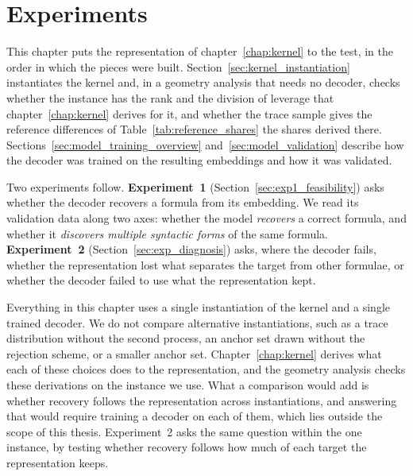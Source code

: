 \documentclass[titlepage,a4paper,11pt]{report}
\newenvironment{RSnewblock}{\par\color{blue!65!black}}{\par}
\begin{document}
\chapter{Experiments}\label{chap:experiments}
    \begin{RSnewblock}
    This chapter puts the representation of chapter~\ref{chap:kernel} to the test, in the order in which the pieces were built. Section~\ref{sec:kernel_instantiation} instantiates the kernel and, in a geometry analysis that needs no decoder, checks whether the instance has the rank and the division of leverage that chapter~\ref{chap:kernel} derives for it, and whether the trace sample gives the reference differences of Table~\ref{tab:reference_shares} the shares derived there. Sections~\ref{sec:model_training_overview} and~\ref{sec:model_validation} describe how the decoder was trained on the resulting embeddings and how it was validated.

    Two experiments follow. \textbf{Experiment~1} (Section~\ref{sec:exp1_feasibility}) asks whether the decoder recovers a formula from its embedding. We read its validation data along two axes: whether the model \emph{recovers} a correct formula, and whether it \emph{discovers multiple syntactic forms} of the same formula. \textbf{Experiment~2} (Section~\ref{sec:exp_diagnosis}) asks, where the decoder fails, whether the representation lost what separates the target from other formulae, or whether the decoder failed to use what the representation kept.

    Everything in this chapter uses a single instantiation of the kernel and a single trained decoder. We do not compare alternative instantiations, such as a trace distribution without the second process, an anchor set drawn without the rejection scheme, or a smaller anchor set. Chapter~\ref{chap:kernel} derives what each of these choices does to the representation, and the geometry analysis checks these derivations on the instance we use. What a comparison would add is whether recovery follows the representation across instantiations, and answering that would require training a decoder on each of them, which lies outside the scope of this thesis. Experiment~2 asks the same question within the one instance, by testing whether recovery follows how much of each target the representation keeps.
    \end{RSnewblock}
\end{document}
